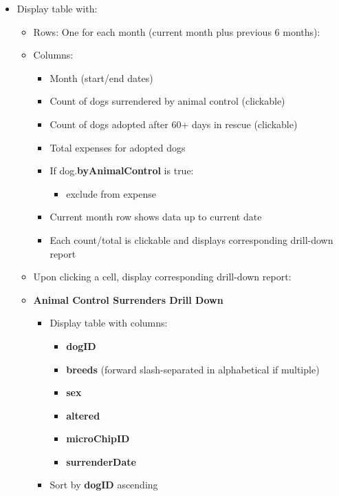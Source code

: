 \documentclass{article}
\begin{document}
\begin{itemize}
\item Display table with:
\begin{itemize}
    \item Rows: One for each month (current month plus previous 6 months):
    \item Columns:
    \begin{itemize}
        \item Month (start/end dates)
        \item Count of dogs surrendered by animal control (clickable)
        \item Count of dogs adopted after 60+ days in rescue (clickable)
        \item Total expenses for adopted dogs
        \item If dog.\textbf{byAnimalControl} is true:
        \begin{itemize}
            \item exclude from expense
        \end{itemize}
        \item Current month row shows data up to current date
        \item Each count/total is clickable and displays corresponding drill-down report
    \end{itemize}
    \item Upon clicking a cell, display corresponding drill-down report:
\end{itemize}        
    \begin{itemize}
        \item \textbf{Animal Control Surrenders Drill Down}
        \begin{itemize}
            \item Display table with columns:
            \begin{itemize}
                \item \textbf{dogID}
                \item \textbf{breeds} (forward slash-separated in alphabetical if multiple)
                \item \textbf{sex}
                \item \textbf{altered}
                \item \textbf{microChipID}
                \item \textbf{surrenderDate}
            \end{itemize}
            \item Sort by \textbf{dogID} ascending

\end{itemize}
\end{itemize}
\end{itemize}
\end{document}
